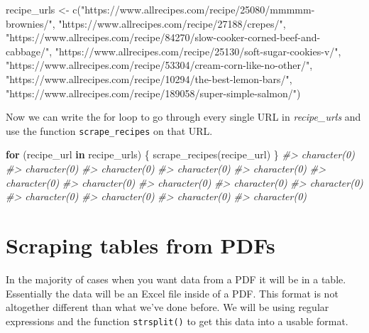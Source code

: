 \documentclass[
]{krantz}
\makeatletter
\newenvironment{Shaded}{\begin{snugshade}}{\end{snugshade}}
\newcommand{\CommentTok}[1]{\textcolor[rgb]{0.37,0.37,0.37}{\textit{#1}}}
\newcommand{\ControlFlowTok}[1]{\textcolor[rgb]{0.27,0.27,0.27}{\textbf{#1}}}
\newcommand{\FunctionTok}[1]{\textcolor[rgb]{0,0,0}{#1}}
\newcommand{\NormalTok}[1]{#1}
\newcommand{\OtherTok}[1]{\textcolor[rgb]{0.37,0.37,0.37}{#1}}
\newcommand{\StringTok}[1]{\textcolor[rgb]{0.5,0.5,0.5}{#1}}
\newenvironment{kframe}{%
\medskip{}
\setlength{\fboxsep}{.8em}
 \def\at@end@of@kframe{}%
 \ifinner\ifhmode%
  \def\at@end@of@kframe{\end{minipage}}%
  \begin{minipage}{\columnwidth}%
 \fi\fi%
 \def\FrameCommand##1{\hskip\@totalleftmargin \hskip-\fboxsep
 \colorbox{shadecolor}{##1}\hskip-\fboxsep
     \hskip-\linewidth \hskip-\@totalleftmargin \hskip\columnwidth}%
 \MakeFramed {\advance\hsize-\width
   \@totalleftmargin\z@ \linewidth\hsize
   \@setminipage}}%
 {\par\unskip\endMakeFramed%
 \at@end@of@kframe}
\renewenvironment{Shaded}{\begin{kframe}}{\end{kframe}}
\makeatother
\begin{document}
\begin{Shaded}
\begin{Highlighting}[]
\NormalTok{recipe\_urls }\OtherTok{\textless{}{-}} \FunctionTok{c}\NormalTok{(}\StringTok{"https://www.allrecipes.com/recipe/25080/mmmmm{-}brownies/"}\NormalTok{,}
  \StringTok{"https://www.allrecipes.com/recipe/27188/crepes/"}\NormalTok{, }\StringTok{"https://www.allrecipes.com/recipe/84270/slow{-}cooker{-}corned{-}beef{-}and{-}cabbage/"}\NormalTok{,}
  \StringTok{"https://www.allrecipes.com/recipe/25130/soft{-}sugar{-}cookies{-}v/"}\NormalTok{,}
  \StringTok{"https://www.allrecipes.com/recipe/53304/cream{-}corn{-}like{-}no{-}other/"}\NormalTok{,}
  \StringTok{"https://www.allrecipes.com/recipe/10294/the{-}best{-}lemon{-}bars/"}\NormalTok{,}
  \StringTok{"https://www.allrecipes.com/recipe/189058/super{-}simple{-}salmon/"}\NormalTok{)}
\end{Highlighting}
\end{Shaded}

Now we can write the for loop to go through every single URL in \emph{recipe\_urls} and use the function \texttt{scrape\_recipes} on that URL.

\begin{Shaded}
\begin{Highlighting}[]
\ControlFlowTok{for}\NormalTok{ (recipe\_url }\ControlFlowTok{in}\NormalTok{ recipe\_urls) \{}
  \FunctionTok{scrape\_recipes}\NormalTok{(recipe\_url)}
\NormalTok{\}}
\CommentTok{\#\textgreater{} character(0)}
\CommentTok{\#\textgreater{} character(0)}
\CommentTok{\#\textgreater{} character(0)}
\CommentTok{\#\textgreater{} character(0)}
\CommentTok{\#\textgreater{} character(0)}
\CommentTok{\#\textgreater{} character(0)}
\CommentTok{\#\textgreater{} character(0)}
\CommentTok{\#\textgreater{} character(0)}
\CommentTok{\#\textgreater{} character(0)}
\CommentTok{\#\textgreater{} character(0)}
\CommentTok{\#\textgreater{} character(0)}
\CommentTok{\#\textgreater{} character(0)}
\CommentTok{\#\textgreater{} character(0)}
\CommentTok{\#\textgreater{} character(0)}
\end{Highlighting}
\end{Shaded}

\hypertarget{scrape-table}{%
\chapter{Scraping tables from PDFs}\label{scrape-table}}

In the majority of cases when you want data from a PDF it will be in a table. Essentially the data will be an Excel file inside of a PDF. This format is not altogether different than what we've done before. We will be using regular expressions and the function \texttt{strsplit()} to get this data into a usable format.
\end{document}

